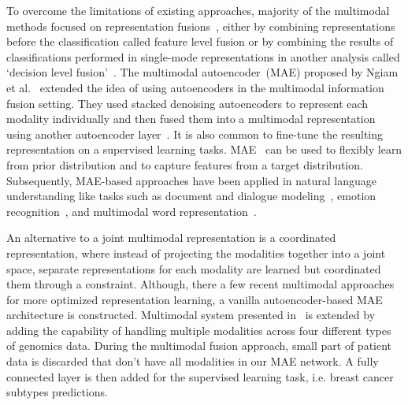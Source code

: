 \hspace*{3.5mm} To overcome the limitations of existing approaches, majority of the multimodal methods focused on representation fusions~\cite{ito2018effects}, either by combining representations before the classification called feature level fusion or by combining the results of classifications performed in single-mode representations in another analysis  called `decision level fusion'~\cite{atrey2010multimodal}. 
The multimodal autoencoder~(MAE) proposed by Ngiam et al.~\cite{NgiamKKNLN11} extended the idea of using autoencoders in the multimodal information fusion setting. They used stacked denoising autoencoders to represent each modality individually and then fused them into a multimodal representation using another autoencoder layer~\cite{mmsurvey,serban2016multi}. It is also common to fine-tune the resulting representation on a supervised learning tasks. 
MAE~\cite{liu2016multimodal,serban2016multi,wang2018associativemulti} can be used to flexibly learn from prior distribution and to capture features from a target distribution. Subsequently, MAE-based approaches have been applied in natural language understanding like tasks such as document and dialogue modeling~\cite{serban2016multi}, emotion recognition~\cite{liu2016multimodal}, and multimodal word representation~\cite{wang2018associativemulti}. 

\hspace*{3.5mm} An alternative to a joint multimodal representation is a coordinated representation, where instead of projecting the modalities together into a joint space, separate representations for each modality are learned but coordinated them through a constraint. Although, there a few recent multimodal approaches for more optimized representation learning, a vanilla autoencoder-based MAE architecture is constructed. Multimodal system presented in~\cite{wang2018associativemulti} is extended by adding the capability of handling multiple modalities across four different types of genomics data. During the multimodal fusion approach, small part of patient data is discarded that don't have all modalities in our MAE network. A fully connected layer is then added for the supervised learning task, i.e. breast cancer subtypes predictions. 


